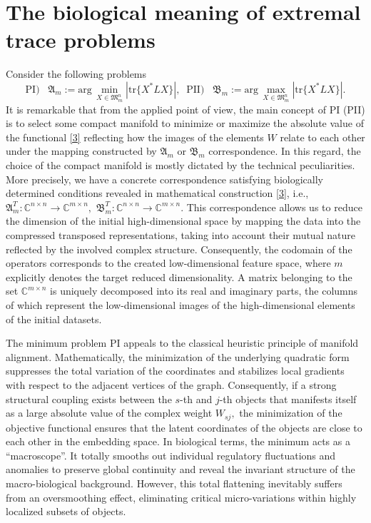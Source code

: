 \documentclass[a4paper,twoside,12pt]{article}
\begin{document}
\section{The  biological meaning of   extremal trace problems}Consider the following  problems
 \begin{equation}\label{3}
  \mathrm{PI})\;\;\; \mathfrak{A}_{m} :=\mathrm{arg}\,\min\limits_{X\in \mathfrak{M}^{n}_{ m}  } \left|\mathrm{tr}\{X^{\ast}LX\}\right|,\;\; \mathrm{PII})\;\;\;
  \mathfrak{B}_{m} :=\mathrm{arg}\,\max\limits_{X\in \mathfrak{M}^{n}_{ m}  } \left|\mathrm{tr}\{X^{\ast}LX\}\right|.
 \end{equation}
 It is remarkable that  from the applied point of view, the main concept of PI (PII)  is to select some compact manifold  to minimize or maximize the absolute value of   the functional \eqref{3} reflecting  how the images of the elements   $W$ relate to each other under the    mapping constructed by    $\mathfrak{A}_{m}$ or $\mathfrak{B}_{m}$ correspondence. In this regard,     the choice of the compact  manifold is mostly dictated by the technical peculiarities. More precisely, we have a concrete  correspondence satisfying   biologically determined   conditions revealed  in mathematical construction  \eqref{3}, i.e.,
$
\mathfrak{A}^{T}_{m}:\mathbb{C}^{n\times n}\rightarrow \mathbb{C}^{m\times n},$ $\mathfrak{B}^{T}_{m}:\mathbb{C}^{n\times n}\rightarrow \mathbb{C}^{m\times n}.
$
This correspondence allows us to reduce the dimension of the initial high-dimensional space by mapping the data into the compressed transposed representations, taking into account their mutual nature  reflected by the involved complex structure. Consequently, the codomain of the operators corresponds to the created low-dimensional feature space, where  $m$  explicitly denotes the target reduced dimensionality. A matrix belonging to the set $\mathbb{C}^{m\times n}$ is uniquely decomposed into its real and imaginary parts, the columns of which represent the low-dimensional images of the high-dimensional elements  of the initial datasets.




The minimum problem \textnormal{PI} appeals to  the classical heuristic principle of  manifold alignment.  Mathematically, the  minimization of the underlying quadratic form suppresses the total variation
of the coordinates and stabilizes local gradients with respect to the adjacent vertices of the graph. Consequently, if a strong structural coupling exists
between the $s$-th and $j$-th objects that  manifests itself  as a large absolute value  of the complex weight $W_{sj},$ the minimization
of the objective functional ensures that the latent coordinates of the objects are close to each other in the embedding space. In biological terms, the minimum acts as a ``macroscope''. It totally smooths out individual regulatory fluctuations and anomalies to preserve global continuity and reveal the invariant structure of the macro-biological background. However, this total flattening inevitably suffers from an oversmoothing effect,
eliminating critical micro-variations within highly localized subsets of objects.
\end{document}
